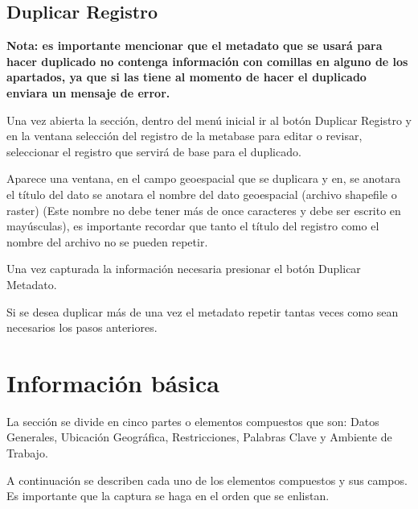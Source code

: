 \documentclass[twoside]{book}
\begin{document}
\section{Duplicar Registro}


\textbf{Nota: es importante mencionar que el metadato que se usará para hacer duplicado no contenga información con comillas en alguno de los apartados, ya que si las tiene al momento de hacer el duplicado enviara un mensaje de error.} 

Una vez abierta la sección, dentro del menú inicial ir al botón Duplicar Registro y en la ventana selección del registro de la metabase para editar o revisar, seleccionar el registro que servirá de base para el duplicado.

Aparece una ventana, en el campo geoespacial que se duplicara y en, se anotara el título del dato se anotara el nombre del dato geoespacial (archivo shapefile o raster) (Este nombre no debe tener más de once caracteres y debe ser escrito en mayúsculas), es importante recordar que tanto el título del registro como el nombre del archivo no se pueden repetir.

Una vez capturada la información necesaria presionar el botón Duplicar Metadato.

Si se desea duplicar más de una vez el metadato repetir tantas veces como sean necesarios los pasos anteriores.

\chapter{Información básica}

La sección se divide en cinco partes o elementos compuestos que son: Datos Generales, Ubicación Geográfica, Restricciones, Palabras Clave y Ambiente de Trabajo.

A continuación se describen cada uno de los elementos compuestos y sus campos. Es importante que la captura se haga en el orden que se enlistan.
\end{document}

